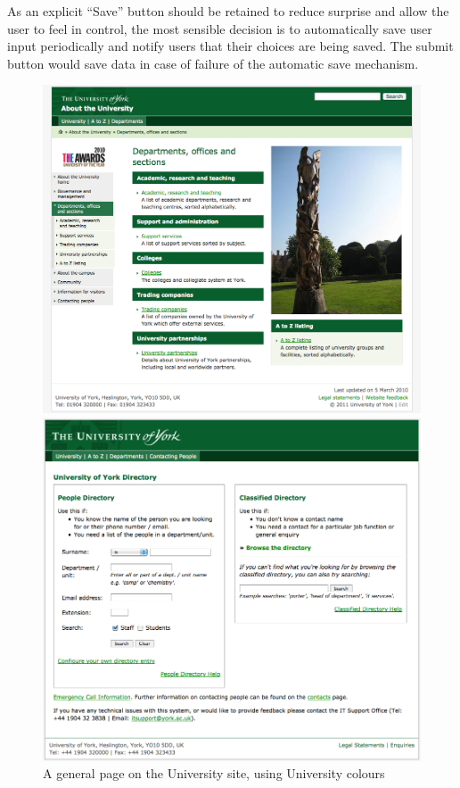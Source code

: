 \documentclass[twoside,draft]{scrartcl}
\begin{document}
As an explicit ``Save'' button should be retained to reduce surprise and allow
the user to feel in control, the most sensible decision is to automatically
save user input periodically and notify users that their choices are being
saved. The submit button would save data in case of failure of the automatic
save mechanism.

\begin{landscape}
  \begin{figure}
    \begin{minipage}[b]{0.49\linewidth}
      \centering
      \includegraphics[width=\linewidth]{images/2011_11_06_yorkacuk.png}
      \caption{A general page on the University site, using University colours}
      \label{yorkacuk_general_page}
    \end{minipage}
    \hspace{0.5cm}
    \begin{minipage}[b]{0.48\linewidth}
      \centering
      \includegraphics[width=\linewidth]{images/2011_11_06_yorkacuk_directory.png}

\end{minipage}
\end{figure}
\end{landscape}
\end{document}
